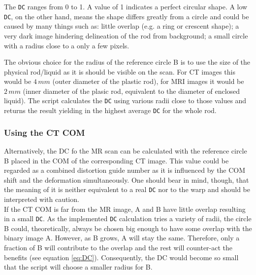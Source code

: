 The \texttt{DC} ranges from 0 to 1.
A value of 1 indicates a perfect circular shape.
A low \texttt{DC}, on the other hand, means the shape differs greatly from a circle and could be caused by many things such as:
little overlap (e.g. a ring or crescent shape); a very dark image hindering delineation of the rod from background; a small circle with a radius close to a only a few pixels.

The obvious choice for the radius of the reference circle B is to use the size of the physical rod/liquid as it is should be visible on the scan.
For CT images this would be $4\,mm$ (outer diameter of the plastic rod), for MRI images it would be $2\,mm$ (inner diameter of the plasic rod, equivalent to the diameter of enclosed liquid).
The script calculates the \texttt{DC} using various radii close to those values and returns the result yielding in the highest average \texttt{DC} for the whole rod.

\subsubsection{Using the CT COM}
Alternatively, the DC fo the MR scan can be calculated with the reference circle B placed in the COM of the corresponding CT image.
This value could be regarded as a combined distortion guide number as it is influenced by the COM shift and the deformation simultaneously.
One should bear in mind, though, that the meaning of it is neither equivalent to a real \texttt{DC} nor to the warp and should be interpreted with caution.\\

If the CT COM is far from the MR image, A and B have little overlap resulting in a small \texttt{DC}.
As the implemented \texttt{DC} calculation tries a variety of radii, the circle B could, theoretically, always be chosen big enough to have some overlap with the binary image A.
However, as B grows, A will stay the same.
Therefore, only a fraction of B will contribute to the overlap and the rest will counter-act the benefits (see equation \ref{eq:DC}).
Consequently, the DC would become so small that the script will choose a smaller radius for B.


